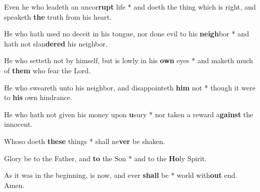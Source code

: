 \begin{multicols}{2}
	Even he who leadeth an uncor\textbf{rupt} life * and doeth the thing which is right, and speaketh \textbf{the} truth from his heart.
	
	He who hath used no deceit in his tongue, nor done evil to his \textbf{neigh}bor * and hath not slan\textbf{dered} his neighbor.
	
	He who setteth not by himself, but is lowly in his \textbf{own} eyes * and maketh much of \textbf{them} who fear the Lord.
	
	He who sweareth unto his neighbor, and disappointeth \textbf{him} not * though it were to \textbf{his} own hindrance.
	
	He who hath not given his money upon \textbf{u}sury * nor taken a reward a\textbf{gainst} the innocent.
	
	Whoso doeth \textbf{these} things * shall ne\textbf{ver} be shaken.
	
	Glory be to the Father, and \textbf{to} the Son * and to the \textbf{Ho}ly Spirit.
	
	As it was in the beginning, is now, and ever \textbf{shall} be * world with\textbf{out} end. Amen.
\end{multicols}